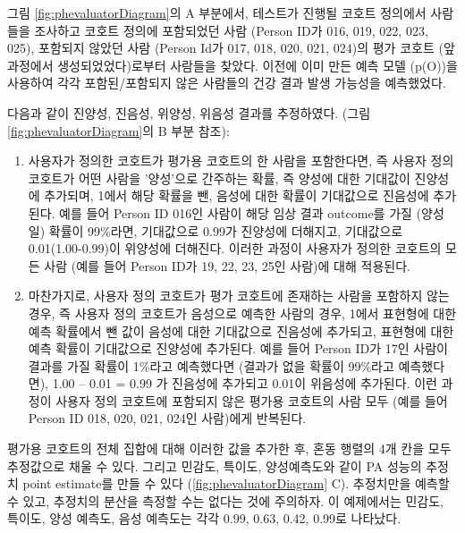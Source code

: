 \documentclass[10.5pt]{book}
\theoremstyle{definition}
\theoremstyle{definition}
\theoremstyle{definition}
\theoremstyle{remark}
\begin{document}
그림 \ref{fig:phevaluatorDiagram}의 A 부분에서, 테스트가 진행될 코호트
정의에서 사람들을 조사하고 코호트 정의에 포함되었던 사람 (Person ID가
016, 019, 022, 023, 025), 포함되지 않았던 사람 (Person Id가 017, 018,
020, 021, 024)의 평가 코호트 (앞 과정에서 생성되었었다)로부터 사람들을
찾았다. 이전에 이미 만든 예측 모델 (p(O))을 사용하여 각각
포함된/포함되지 않은 사람들의 건강 결과 발생 가능성을 예측했었다.

다음과 같이 진양성, 진음성, 위양성, 위음성 결과를 추정하였다. (그림
\ref{fig:phevaluatorDiagram}의 B 부분 참조):

\begin{enumerate}
\def\labelenumi{\arabic{enumi}.}
\item
  사용자가 정의한 코호트가 평가용 코호트의 한 사람을 포함한다면, 즉
  사용자 정의 코호트가 어떤 사람을 '양성'으로 간주하는 확률, 즉 양성에
  대한 기대값이 진양성에 추가되며, 1에서 해당 확률을 뺀, 음성에 대한
  확률이 기대값으로 진음성에 추가된다. 예를 들어 Person ID 016인 사람이
  해당 임상 결과 outcome를 가질 (양성일) 확률이 99\%라면, 기대값으로
  0.99가 진양성에 더해지고, 기대값으로 0.01(1.00-0.99)이 위양성에
  더해진다. 이러한 과정이 사용자가 정의한 코호트의 모든 사람 (예를 들어
  Person ID가 19, 22, 23, 25인 사람)에 대해 적용된다.
\item
  마찬가지로, 사용자 정의 코호트가 평가 코호트에 존재하는 사람을
  포함하지 않는 경우, 즉 사용자 정의 코호트가 음성으로 예측한 사람의
  경우, 1에서 표현형에 대한 예측 확률에서 뺀 값이 음성에 대한 기대값으로
  진음성에 추가되고, 표현형에 대한 예측 확률이 기대값으로 진양성에
  추가된다. 예를 들어 Person ID가 17인 사람이 결과를 가질 확률이 1\%라고
  예측했다면 (결과가 없을 확률이 99\%라고 예측했다면), 1.00 -- 0.01 =
  0.99 가 진음성에 추가되고 0.01이 위음성에 추가된다. 이런 과정이 사용자
  정의 코호트에 포함되지 않은 평가용 코호트의 사람 모두 (예를 들어
  Person ID 018, 020, 021, 024인 사람)에게 반복된다.
\end{enumerate}

평가용 코호트의 전체 집합에 대해 이러한 값을 추가한 후, 혼동 행렬의 4개
칸을 모두 추정값으로 채울 수 있다. 그리고 민감도, 특이도, 양성예측도와
같이 PA 성능의 추정치 point estimate를 만들 수 있다
(\ref{fig:phevaluatorDiagram} C). 추정치만을 예측할 수 있고, 추정치의
분산을 측정할 수는 없다는 것에 주의하자. 이 예제에서는 민감도, 특이도,
양성 예측도, 음성 예측도는 각각 0.99, 0.63, 0.42, 0.99로 나타났다.
\end{document}
